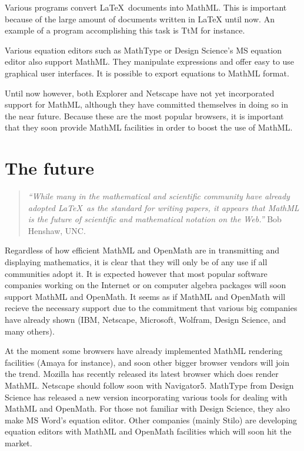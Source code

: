 Various programs convert \LaTeX~documents into MathML. This is important because of the large amount of documents written
in LaTeX\index{\LaTeX} until now. An example of a program accomplishing this task is TtM \cite{TtM} for
instance.

Various equation editors such as MathType or Design Science's MS equation editor also support
MathML. They manipulate expressions and offer easy to use graphical user interfaces. It is possible to
export equations to MathML format.

Until now however, both Explorer and Netscape have not yet incorporated support for
MathML, although they have committed themselves in doing so in the near future. Because these are the most
popular browsers, it is important that they soon provide MathML facilities in order to boost the use of
MathML.

\newpage

\section{The future}

\begin{quotation}

\emph{``While many in the mathematical and scientific community have already adopted \LaTeX~as the standard for writing
papers, it appears that MathML is the future of scientific and mathematical notation on the Web.''} Bob
Henshaw, UNC.

\end{quotation}

Regardless of how efficient MathML and OpenMath are in transmitting and displaying mathematics, it is clear
that they will only be of any use if all communities adopt it. It is expected however that most popular software companies
working on the Internet or on computer algebra packages will soon support MathML and OpenMath. It seems as if MathML and
OpenMath will recieve the necessary support due to the commitment that various big companies have already shown
(IBM, Netscape, Microsoft, Wolfram, Design Science, and many others).

At the moment some browsers have already implemented MathML rendering facilities (Amaya for
instance), and soon other bigger browser vendors will join the trend. Mozilla has recently released its latest browser
which does render MathML. Netscape should follow soon with Navigator5. MathType from Design
Science has released a new version incorporating various tools for dealing with MathML and OpenMath.
For those not familiar with Design Science, they also make MS Word's equation editor. Other
companies (mainly Stilo) are developing equation editors with MathML and OpenMath facilities which will soon hit the
market.

